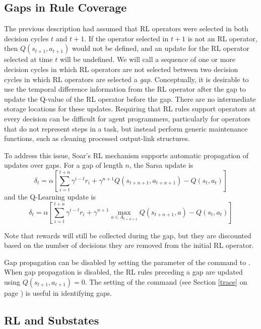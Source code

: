 \subsection{Gaps in Rule Coverage}
\label{RL-gaps}

The previous description had assumed that RL operators were selected in both decision cycles $t$ and $t+1$.
If the operator selected in $t+1$ is not an RL operator, then $Q(s_{t+1}, a_{t+1})$ would not be defined, and an update for the RL operator selected at time $t$ will be undefined.
We will call a sequence of one or more decision cycles in which RL operators are not selected between two decision cycles in which RL operators are selected a \emph{gap}.
Conceptually, it is desirable to use the temporal difference information from the RL operator after the gap to update the Q-value of the RL operator before the gap.
There are no intermediate storage locations for these updates.
Requiring that RL rules support operators at every decision can be difficult for agent programmers, particularly for operators that do not represent steps in a task, but instead perform generic maintenance functions, such as cleaning processed output-link structures.

To address this issue, Soar's RL mechanism supports automatic propagation of updates over gaps.
For a gap of length $n$, the Sarsa update is
$$\delta_t = \alpha \left[ \sum_{i=t}^{t+n}{\gamma^{i-t} r_i} + \gamma^{n+1} Q(s_{t+n+1}, a_{t+n+1}) - Q(s_t, a_t) \right]$$
and the Q-Learning update is
$$\delta_t = \alpha \left[ \sum_{i=t}^{t+n}{\gamma^{i-t} r_i} + \gamma^{n+1} \underset{a \in A_{t+n+1}}{\max} Q(s_{t+n+1}, a) - Q(s_t, a_t) \right]$$

Note that rewards will still be collected during the gap, but they are discounted based on the number of decisions they are removed from the initial RL operator.

Gap propagation can be disabled by setting the  parameter of the  command to .
When gap propagation is disabled, the RL rules preceding a gap are updated using $Q(s_{t+1}, a_{t+1}) = 0$.
The  setting of the  command (see Section \ref{trace} on page \pageref{trace}) is useful in identifying gaps.


\subsection{RL and Substates}
\label{RL-substates}

